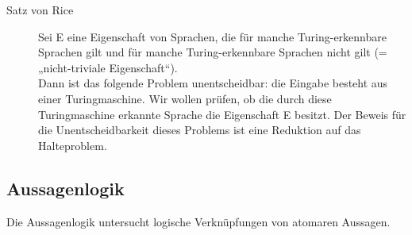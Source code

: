 \begin{description}
    \item[Satz von Rice]
        Sei E eine Eigenschaft von Sprachen, die für manche Turing-erkennbare Sprachen gilt und für manche Turing-erkennbare Sprachen nicht gilt (= „nicht-triviale Eigenschaft“). \\ Dann ist das folgende Problem unentscheidbar: die Eingabe besteht aus einer Turingmaschine. Wir wollen prüfen, ob die durch diese Turingmaschine erkannte Sprache die Eigenschaft E besitzt. Der Beweis für die Unentscheidbarkeit dieses Problems ist eine Reduktion auf das Halteproblem. 

\end{description}

\newpage
\subsection{Aussagenlogik}
    Die Aussagenlogik untersucht logische Verknüpfungen von atomaren Aussagen. 

